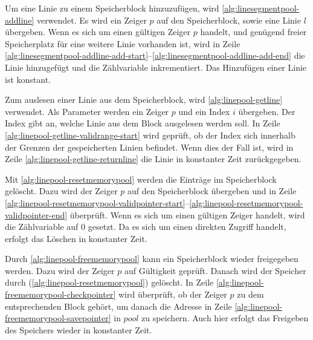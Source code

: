 



Um eine Linie zu einem Speicherblock hinzuzufügen, wird \autoref{alg:linesegmentpool-addline} verwendet. Es wird ein Zeiger
 $p$ auf den Speicherblock, sowie eine Linie $l$ übergeben. Wenn es sich um einen gültigen Zeiger $p$ handelt, und
 genügend freier Speicherplatz für eine weitere Linie vorhanden ist, wird in Zeile
 \ref{alg:linesegmentpool-addline-add-start}--\ref{alg:linesegmentpool-addline-add-end} die Linie hinzugefügt und die
 Zählvariable inkrementiert. Das Hinzufügen einer Linie ist konstant.



Zum auslesen einer Linie aus dem Speicherblock, wird \autoref{alg:linepool-getline} verwendet. Als Parameter werden ein
 Zeiger $p$ und ein Index $i$ übergeben. Der Index gibt an, welche Linie aus dem Block ausgelesen werden soll. In Zeile
 \ref{alg:linepool-getline-validrange-start} wird geprüft, ob der Index sich innerhalb der Grenzen der gespeicherten
 Linien befindet. Wenn dies der Fall ist, wird in Zeile \ref{alg:linepool-getline-returnline} die Linie in konstanter
 Zeit zurückgegeben.



Mit \autoref{alg:linepool-resetmemorypool} werden die Einträge im Speicherblock gelöscht. Dazu wird der Zeiger $p$ auf
 den Speicherblock übergeben und in Zeile
 \ref{alg:linepool-resetmemorypool-validpointer-start}--\ref{alg:linepool-resetmemorypool-validpointer-end} überprüft.
 Wenn es sich um einen gültigen Zeiger handelt, wird die Zählvariable auf $0$ gesetzt. Da es sich um einen direkten
 Zugriff handelt, erfolgt das Löschen in konstanter Zeit.



Durch \autoref{alg:linepool-freememorypool} kann ein Speicherblock wieder freigegeben werden. Dazu wird der Zeiger $p$
 auf Gültigkeit geprüft. Danach wird der Speicher durch 
 (\autoref{alg:linepool-resetmemorypool}) gelöscht. In Zeile \ref{alg:linepool-freememorypool-checkpointer} wird
 überprüft, ob der Zeiger $p$ zu dem entsprechenden Block gehört, um danach die Adresse in Zeile
 \ref{alg:linepool-freememorypool-savepointer} in $\mathit{pool}$ zu speichern. Auch hier erfolgt das Freigeben des
 Speichers wieder in konstanter Zeit.

